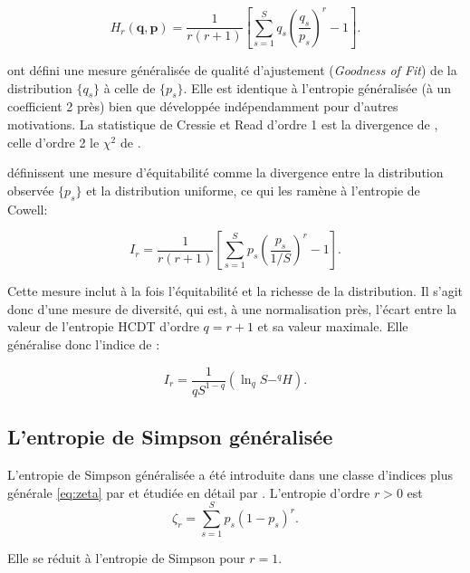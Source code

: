 \documentclass[
  11pt,
  french,
  a4paper,
  extrafontsizes,onecolumn,openright
  ]{memoir}
\begin{document}
\begin{equation}
  \label{eq:Maasoumi1993}
  H_r\left(\mathbf{q},\mathbf{p}\right) = \frac{1}{r\left(r+1\right)}\left[\sum^S_{s=1}{q_s{\left(\frac{q_s}{p_s}\right)}^{r}}-1\right].
\end{equation}

\textcite{Cressie1984} ont défini une mesure généralisée de qualité d'ajustement (\emph{Goodness of Fit}) de la distribution \(\{q_s\}\) à celle de \(\{p_s\}\).
Elle est identique à l'entropie généralisée (à un coefficient 2 près) bien que développée indépendamment pour d'autres motivations.
La statistique de Cressie et Read d'ordre 1 est la divergence de \textcite{Kullback1951}, celle d'ordre 2 le \(\chi^2\) de \textcite{Pearson1900}.

\textcite{Studeny2011} définissent une mesure d'équitabilité comme la divergence entre la distribution observée \(\{p_s\}\) et la distribution uniforme, ce qui les ramène à l'entropie de Cowell:

\begin{equation}
  \label{eq:Studeny2011}
  I_r 
  = \frac{1}{r\left(r+1\right)} \left[\sum^S_{s=1}{p_s \left(\frac{p_s}{1/S} \right)^{r}-1 } \right].
\end{equation}

Cette mesure inclut à la fois l'équitabilité et la richesse de la distribution.
Il s'agit donc d'une mesure de diversité, qui est, à une normalisation près, l'écart entre la valeur de l'entropie HCDT d'ordre \(q=r+1\) et sa valeur maximale.
Elle généralise donc l'indice de \textcite{Theil1967}:

\begin{equation}
  \label{eq:TheilGen}
  I_r = \frac{1}{q S^{1-q}}\left( \ln_q{S} - ^{q}\!H \right).
\end{equation}

\subsection{L'entropie de Simpson généralisée}\label{sec-SimpsonG}

L'entropie de Simpson généralisée a été introduite dans une classe d'indices plus générale \eqref{eq:zeta} par \textcite{Zhang2010} et étudiée en détail par \textcite{Zhang2014}.
L'entropie d'ordre \(r>0\) est
\begin{equation}
  \label{eq:zetar}
  \zeta_r = \sum_{s=1}^S p_s (1-p_s)^r.
\end{equation}

Elle se réduit à l'entropie de Simpson pour \(r=1\).
\end{document}
